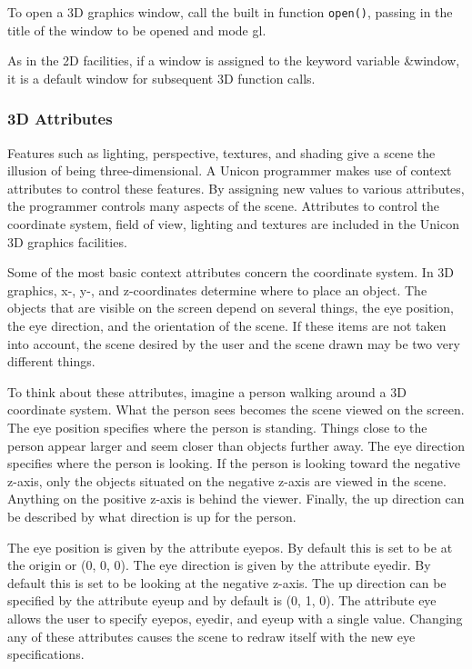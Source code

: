 To open a 3D graphics window, call the built in function \texttt{open()},
passing in the title of the window to be opened and mode
{\textquotedbl}gl{\textquotedbl}.


\noindent
As in the 2D facilities, if a window is assigned to the keyword variable
\&window, it is a default window for subsequent 3D function calls. 

\subsubsection{3D Attributes}

Features such as lighting, perspective, textures, and shading give a
scene the illusion of being three-dimensional. A Unicon programmer makes
use of context attributes to control these features. By
assigning new values to various attributes, the programmer controls
many aspects of the scene. Attributes to control the coordinate system,
field of view, lighting and textures are included in the Unicon 3D
graphics facilities. 

Some of the most basic context attributes concern the coordinate system.
In 3D graphics, x-, y-, and z-coordinates
determine where to place an object. The objects that are visible on the
screen depend on several things, the eye position, the eye direction,
and the orientation of the scene. If these items are not taken into
account, the scene desired by the user and the scene drawn may be two
very different things. 

To think about these attributes, imagine a person walking around a 3D
coordinate system. What the person sees becomes the scene viewed on the
screen. The eye position specifies where the person is standing. Things
close to the person appear larger and seem closer than objects further
away. The eye direction specifies where the person is looking. If the
person is looking toward the negative z-axis, only the objects situated
on the negative z-axis are viewed in the scene. Anything on the
positive z-axis is behind the viewer. Finally, the up direction can be
described by what direction is up for the person. 

The eye position is given by the attribute eyepos. By default this is
set to be at the origin or (0, 0, 0). The eye direction is given by the
attribute eyedir. By default this is set to be looking at the negative
z-axis. The up direction can be specified by the attribute eyeup and by
default is (0, 1, 0). The attribute eye allows the user to specify
eyepos, eyedir, and eyeup with a single value. Changing any of these
attributes causes the scene to redraw itself with the new eye
specifications.

